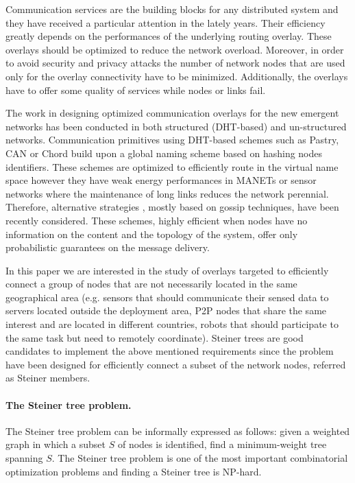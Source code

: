\documentclass[11pt]{article}
\begin{document}
Communication services are the building blocks for any distributed
system and they have received a particular attention in the lately
years. Their efficiency greatly depends 
on the performances of the underlying routing overlay. 
These overlays should be optimized to reduce the network
overload. Moreover, in order 
to avoid security and privacy attacks the number of network nodes that
are used only for the overlay connectivity have to be minimized. Additionally, the overlays have to offer 
some quality of services while nodes or links fail.
  
The work in designing optimized communication overlays for the new emergent
networks has been conducted in both structured (DHT-based) and un-structured networks. 
Communication primitives using DHT-based schemes such as Pastry, CAN or Chord  \cite{CDCHR03} 
build upon a global naming scheme based on hashing nodes identifiers.
These schemes are optimized to efficiently route in the virtual name
space however they have weak energy performances in MANETs or
sensor networks where the maintenance of long links reduces the
network perennial. Therefore, alternative strategies \cite{KS07}, mostly based on
gossip techniques, 
have been recently considered. These schemes, highly 
efficient when nodes have no information on the content and the topology of the system,
offer only probabilistic guarantees on the message delivery.

In this paper we are interested in the study of overlays targeted 
to efficiently connect a group of nodes that are 
not necessarily located in the same geographical area (e.g. sensors that should communicate their 
sensed data to servers located outside the deployment area, P2P nodes that share the same 
interest and are located in different countries, robots that should 
participate to the same task but need to remotely coordinate). Steiner trees are good 
candidates to implement the above mentioned requirements since the problem have been 
designed for efficiently connect a subset of the network nodes, referred as Steiner members. 


\paragraph{The Steiner tree problem.}

The Steiner tree problem can be informally expressed as follows: 
given a weighted graph 
in which a subset $S$ 
of nodes 
is identified, 
find a minimum-weight tree spanning $S$.
The Steiner tree problem is one of the most important 
combinatorial optimization problems and finding a Steiner tree is NP-hard. 
\end{document}
